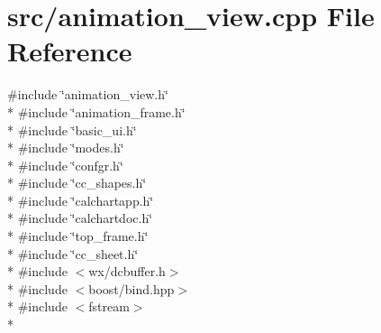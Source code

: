 \hypertarget{a00172}{\section{src/animation\-\_\-view.cpp File Reference}
\label{a00172}
}
{\ttfamily \#include \char`\"{}animation\-\_\-view.\-h\char`\"{}}\\*
{\ttfamily \#include \char`\"{}animation\-\_\-frame.\-h\char`\"{}}\\*
{\ttfamily \#include \char`\"{}basic\-\_\-ui.\-h\char`\"{}}\\*
{\ttfamily \#include \char`\"{}modes.\-h\char`\"{}}\\*
{\ttfamily \#include \char`\"{}confgr.\-h\char`\"{}}\\*
{\ttfamily \#include \char`\"{}cc\-\_\-shapes.\-h\char`\"{}}\\*
{\ttfamily \#include \char`\"{}calchartapp.\-h\char`\"{}}\\*
{\ttfamily \#include \char`\"{}calchartdoc.\-h\char`\"{}}\\*
{\ttfamily \#include \char`\"{}top\-\_\-frame.\-h\char`\"{}}\\*
{\ttfamily \#include \char`\"{}cc\-\_\-sheet.\-h\char`\"{}}\\*
{\ttfamily \#include $<$wx/dcbuffer.\-h$>$}\\*
{\ttfamily \#include $<$boost/bind.\-hpp$>$}\\*
{\ttfamily \#include $<$fstream$>$}\\*
